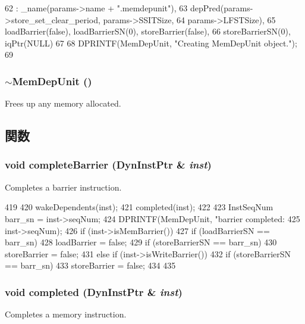 \begin{DoxyCode}
62     : _name(params->name + ".memdepunit"),
63       depPred(params->store_set_clear_period, params->SSITSize,
64               params->LFSTSize),
65       loadBarrier(false), loadBarrierSN(0), storeBarrier(false),
66       storeBarrierSN(0), iqPtr(NULL)
67 {
68     DPRINTF(MemDepUnit, "Creating MemDepUnit object.\n");
69 }
\end{DoxyCode}
\hypertarget{classMemDepUnit_a45331beda5c09d8c776b6bd7c1814b59}{
\subsubsection[{$\sim$MemDepUnit}]{\setlength{\rightskip}{0pt plus 5cm}$\sim${\bf MemDepUnit} ()}}
\label{classMemDepUnit_a45331beda5c09d8c776b6bd7c1814b59}
Frees up any memory allocated. 

\subsection{関数}
\hypertarget{classMemDepUnit_a9debd021c4b533f5bbd174890037d2dd}{
\subsubsection[{completeBarrier}]{\setlength{\rightskip}{0pt plus 5cm}void completeBarrier ({\bf DynInstPtr} \& {\em inst})}}
\label{classMemDepUnit_a9debd021c4b533f5bbd174890037d2dd}
Completes a barrier instruction. 


\begin{DoxyCode}
419 {
420     wakeDependents(inst);
421     completed(inst);
422 
423     InstSeqNum barr_sn = inst->seqNum;
424     DPRINTF(MemDepUnit, "barrier completed: %
425             inst->seqNum);
426     if (inst->isMemBarrier()) {
427         if (loadBarrierSN == barr_sn)
428             loadBarrier = false;
429         if (storeBarrierSN == barr_sn)
430             storeBarrier = false;
431     } else if (inst->isWriteBarrier()) {
432         if (storeBarrierSN == barr_sn)
433             storeBarrier = false;
434     }
435 }
\end{DoxyCode}
\hypertarget{classMemDepUnit_a4970c417e5fac50b9a28caea195717c3}{
\subsubsection[{completed}]{\setlength{\rightskip}{0pt plus 5cm}void completed ({\bf DynInstPtr} \& {\em inst})}}
\label{classMemDepUnit_a4970c417e5fac50b9a28caea195717c3}
Completes a memory instruction. 


